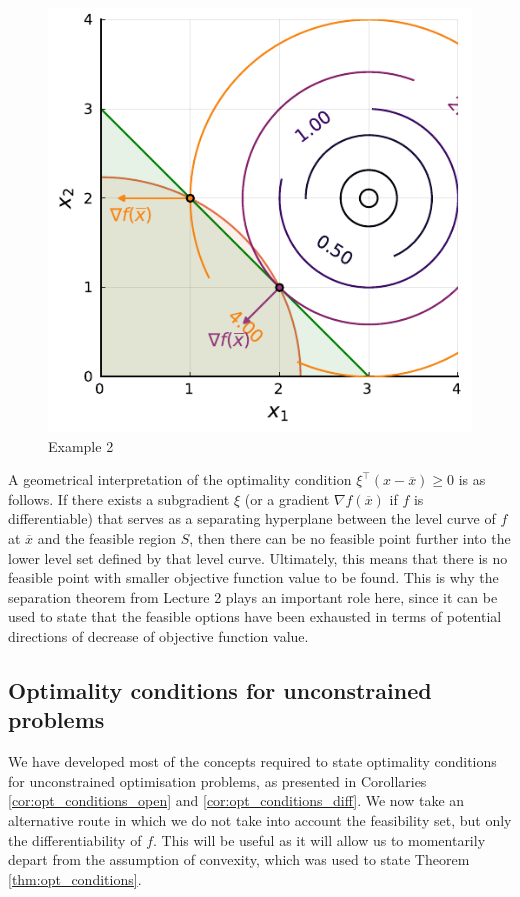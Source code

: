 \begin{figure}[H]
	\includegraphics{part_2/chapter_4/figures/ex2.pdf}
	\caption{Example 2}	\label{fig:ex_2}
\end{figure}

A geometrical interpretation of the optimality condition $\xi^\top(x - \overline{x}) \geq 0$ is as follows. If there exists a subgradient $\xi$ (or a gradient $\nabla f(\overline{x})$ if $f$ is differentiable) that serves as a separating hyperplane between the level curve of $f$ at $\overline{x}$ and the feasible region $S$, then there can be no feasible point further into the lower level set defined by that level curve. Ultimately, this means that there is no feasible point with smaller objective function value to be found. This is why the separation theorem from Lecture 2 plays an important role here, since it can be used to state that the feasible options have been exhausted in terms of potential directions of decrease of objective function value.  

\subsection{Optimality conditions for unconstrained problems}

We have developed most of the concepts required to state optimality conditions for unconstrained optimisation problems, as presented in Corollaries \ref{cor:opt_conditions_open} and \ref{cor:opt_conditions_diff}. We now take an alternative route in which we do not take into account the feasibility set, but only the differentiability of $f$. This will be useful as it will allow us to momentarily depart from the assumption of convexity, which was used to state Theorem \ref{thm:opt_conditions}. 

